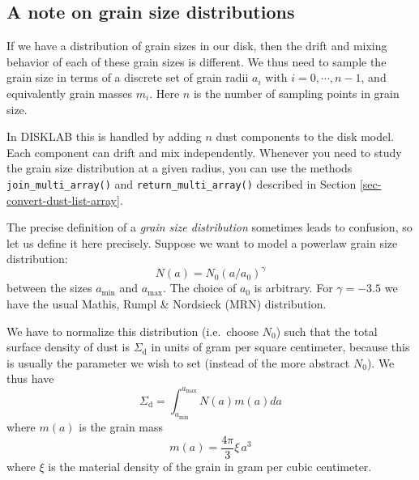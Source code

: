 \documentclass{book}
\newcommand{\code}[1]{{\small\tt #1}}
\begin{document}
\subsection{A note on grain size distributions}
If we have a distribution of grain sizes in our disk, then the drift and mixing
behavior of each of these grain sizes is different. We thus need to sample the
grain size in terms of a discrete set of grain radii $a_i$ with
$i=0,\cdots,n-1$, and equivalently grain masses $m_i$. Here $n$ is the number of
sampling points in grain size.

In {\sf DISKLAB} this is handled by adding $n$ dust components to the disk
model.  Each component can drift and mix independently. Whenever you need to
study the grain size distribution at a given radius, you can use the methods
\code{join\_multi\_array()} and \code{return\_multi\_array()} described in
Section \ref{sec-convert-dust-list-array}.

The precise definition of a {\em grain size distribution} sometimes leads to
confusion, so let us define it here precisely. Suppose we want to model a
powerlaw grain size distribution:
\begin{equation}\label{eq-powerlaw-grain-size-distribution}
N(a) = N_0 (a/a_0)^{\gamma}
\end{equation}
between the sizes $a_\mathrm{min}$ and $a_\mathrm{max}$. The choice of $a_0$ is
arbitrary. For $\gamma=-3.5$ we have the usual Mathis, Rumpl \& Nordsieck (MRN)
distribution.

We have to normalize this distribution (i.e.\ choose $N_0$) such that the total
surface density of dust is $\Sigma_{\mathrm{d}}$ in units of gram per square
centimeter, because this is usually the parameter we wish to set (instead of the
more abstract $N_0$). We thus have
\begin{equation}\label{eq-graindistr-sigmatot}
\Sigma_{\mathrm{d}}=\int_{a_{\mathrm{min}}}^{a_{\mathrm{max}}}N(a)m(a)da
\end{equation}
where $m(a)$ is the grain mass
\begin{equation}
m(a) = \frac{4\pi}{3}\xi\,a^3
\end{equation}
where $\xi$ is the material density of the grain in gram per cubic centimeter.
\end{document}
